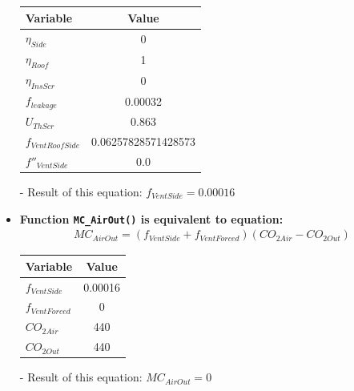 \documentclass[a4paper]{article}
\numberwithin{equation}{section}
\begin{document}
\begin{itemize}
        \begin{table}[H]
          \centering
          \begin{tabular}{@{}lS[table-format=1.17]@{}}
            \toprule
            \textbf{Variable}    & \textbf{Value}      \\
            \midrule
            \( \eta_{Side} \)      & 0                   \\
            \( \eta_{Roof} \)      & 1                   \\
            \( \eta_{InsScr} \)    & 0                   \\
            \( f_{leakage} \)      & 0.00032             \\
            \( U_{ThScr} \)        & 0.863               \\
            \( f_{VentRoofSide} \) & 0.06257828571428573 \\
            \( f''_{VentSide} \)   & 0.0                 \\
            \bottomrule
          \end{tabular}
        \end{table}

  \item[-] Result of this equation: \( f_{VentSide} = 0.00016 \)

  \item \textbf{Function \texttt{MC\_AirOut()} is equivalent to equation:}
        \begin{align*}
          MC_{AirOut} = (f_{VentSide} + f_{VentForced})(CO_{2 Air} - CO_{2 Out})
        \end{align*}

        \begin{table}[H]
          \centering
          \begin{tabular}{@{}lS@{}}
            \toprule
            \textbf{Variable}  & \textbf{Value} \\
            \midrule
            \( f_{VentSide} \)   & 0.00016        \\
            \( f_{VentForced} \) & 0              \\
            \( CO_{2 Air} \)     & 440            \\
            \( CO_{2 Out} \)     & 440            \\
            \bottomrule
          \end{tabular}
        \end{table}

  \item[-] Result of this equation: \( MC_{AirOut} = 0 \)


\end{itemize}
\end{document}
